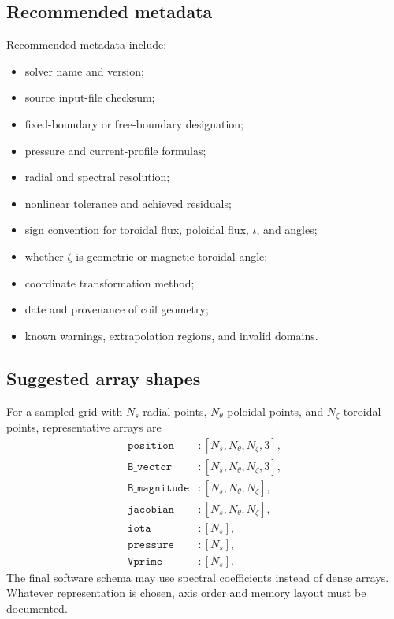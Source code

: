 \subsection{Recommended metadata}
Recommended metadata include:
\begin{itemize}[leftmargin=1.6em]
\item solver name and version;
\item source input-file checksum;
\item fixed-boundary or free-boundary designation;
\item pressure and current-profile formulas;
\item radial and spectral resolution;
\item nonlinear tolerance and achieved residuals;
\item sign convention for toroidal flux, poloidal flux, $\iota$, and angles;
\item whether $\zeta$ is geometric or magnetic toroidal angle;
\item coordinate transformation method;
\item date and provenance of coil geometry;
\item known warnings, extrapolation regions, and invalid domains.
\end{itemize}

\subsection{Suggested array shapes}
For a sampled grid with $N_s$ radial points, $N_\theta$ poloidal points, and $N_\zeta$ toroidal points, representative arrays are
\begin{align}
\texttt{position}&:[N_s,N_\theta,N_\zeta,3],\\
\texttt{B\_vector}&:[N_s,N_\theta,N_\zeta,3],\\
\texttt{B\_magnitude}&:[N_s,N_\theta,N_\zeta],\\
\texttt{jacobian}&:[N_s,N_\theta,N_\zeta],\\
\texttt{iota}&:[N_s],\\
\texttt{pressure}&:[N_s],\\
\texttt{Vprime}&:[N_s].
\end{align}
The final software schema may use spectral coefficients instead of dense arrays. Whatever representation is chosen, axis order and memory layout must be documented.

